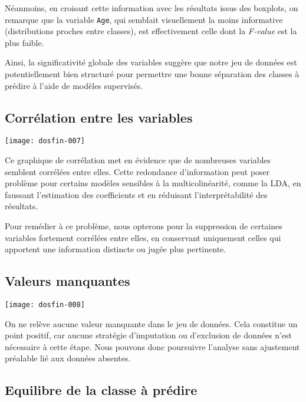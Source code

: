 \documentclass[a4paper,11pt]{article}
\begin{document}
Néanmoins, en croisant cette information avec les résultats issus des boxplots, on remarque que la variable \texttt{Age}, qui semblait visuellement la moins informative (distributions proches entre classes), est effectivement celle dont la \textit{F-value} est la plus faible.

Ainsi, la significativité globale des variables suggère que notre jeu de données est potentiellement bien structuré pour permettre une bonne séparation des classes à prédire à l’aide de modèles supervisés.

\subsection{Corrélation entre les variables}

\begin{center}

\texttt{[image: dosfin-007]}
\end{center}

  Ce graphique de corrélation met en évidence que de nombreuses variables semblent corrélées entre elles. Cette redondance d'information peut poser problème pour certains modèles sensibles à la multicolinéarité, comme la LDA, en faussant l’estimation des coefficients et en réduisant l’interprétabilité des résultats.

Pour remédier à ce problème, nous opterons pour la suppression de certaines variables fortement corrélées entre elles, en conservant uniquement celles qui apportent une information distincte ou jugée plus pertinente.


\newpage

\subsection{Valeurs manquantes}

\begin{center}

\texttt{[image: dosfin-008]}

\end{center}

On ne relève aucune valeur manquante dans le jeu de données. Cela constitue un point positif, car aucune stratégie d'imputation ou d'exclusion de données n’est nécessaire à cette étape. Nous pouvons donc poursuivre l’analyse sans ajustement préalable lié aux données absentes.

\subsection{Equilibre de la classe à prédire}
\end{document}
